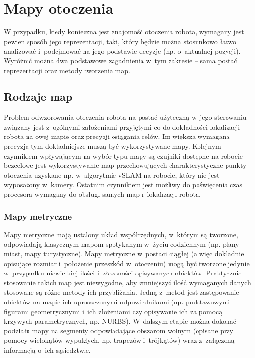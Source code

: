 \section{Mapy otoczenia}

W przypadku, kiedy konieczna jest znajomość otoczenia robota, wymagany jest pewien
sposób jego reprezentacji, taki, który będzie można stosunkowo łatwo analizować
i~podejmować na jego podstawie decyzje (np. o~aktualnej pozycji). Wyróżnić
można dwa podstawowe zagadnienia w~tym zakresie -- sama postać reprezentacji
oraz metody tworzenia map.

\subsection{Rodzaje map}

Problem odwzorowania otoczenia robota na postać użyteczną w~jego sterowaniu
związany jest z~ogólnymi założeniami przyjętymi co do dokładności lokalizacji robota
na owej mapie oraz precyzji osiągania celów. Im większa wymagana precyzja
tym dokładniejsze muszą być wykorzystywane mapy. Kolejnym czynnikiem wpływającym
na wybór typu mapy są czujniki dostępne na robocie -- bezcelowe jest wykorzystywanie
map przechowujących charakterystyczne punkty otoczenia uzyskane np. w~algorytmie
vSLAM na robocie, który nie jest wyposażony w~kamery. Ostatnim czynnikiem
jest możliwy do poświęcenia czas procesora wymagany do obsługi samych map
i~lokalizacji robota.

\subsubsection{Mapy metryczne}

Mapy metryczne mają ustalony układ współrzędnych, w~którym są tworzone, odpowiadają
klasycznym mapom spotykanym w~życiu codziennym (np. plany miast, mapy turystyczne).
Mapy metryczne w~postaci ciągłej (a więc dokładnie opisujące rozmiar i~położenie
przeszkód w~otoczeniu) mogą być tworzone jedynie w~przypadku niewielkiej ilości
i~złożoności opisywanych obiektów. Praktycznie stosowanie takich map jest niewygodne,
aby zmniejszyć ilość wymaganych danych stosowane są różne metody ich przybliżania.
Jedną z~metod jest zastępowanie obiektów na mapie ich uproszczonymi odpowiednikami
(np. podstawowymi figurami geometrycznymi i~ich złożeniami czy opisywanie ich za pomocą
krzywych parametrycznych, np. NURBS). W~dalszym etapie można dokonać podziału mapy
na segmenty odpowiadające obszarom wolnym (opisane przy pomocy wielokątów wypukłych,
np. trapezów i~trójkątów) wraz z~załączoną informacją o~ich sąsiedztwie.

